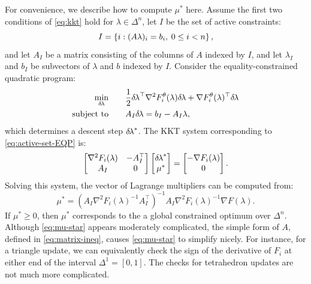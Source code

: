 \documentclass[eikonal.tex]{subfiles}
\begin{document}
For convenience, we describe how to compute $\mu^*$ here. Assume the
first two conditions of \cref{eq:kkt} hold for $\lambda \in \Delta^n$,
let $I$ be the set of active constraints:
\begin{equation}
  I = \left\{i : (A\lambda)_i = b_i, \hspace{0.25em} 0 \leq i < n\right\},
\end{equation}
and let $A_I$ be a matrix consisting of the columns of $A$ indexed by
$I$, and let $\lambda_I$ and $b_I$ be subvectors of $\lambda$ and $b$
indexed by $I$. Consider the equality-constrained quadratic program:
\begin{equation}
  \label{eq:active-set-EQP}
  \begin{split}
    \min_{\dellam} &\qquad \frac{1}{2} \dellam^\top \nabla^2 F_i^\theta (\lambda) \dellam + \nabla F_i^\theta(\lambda)^\top \dellam \\
    \text{subject to} &\qquad A_I \dellam = b_I - A_I \lambda,
  \end{split}
\end{equation}
which determines a descent step ${\delta \hspace{-0.1em} \lambda}^*$. The KKT system
corresponding to \cref{eq:active-set-EQP} is:
\begin{equation}
  \begin{bmatrix}
    \nabla^2 F_i (\lambda) & -A_I^\top \\
    A_I & 0
  \end{bmatrix} \begin{bmatrix}
    {\delta \hspace{-0.1em} \lambda}^* \\ \mu^*
  \end{bmatrix} = \begin{bmatrix}
    -\nabla F_i(\lambda) \\ 0
  \end{bmatrix}.
\end{equation}
Solving this system, the vector of Lagrange multipliers can be
computed from:
\begin{equation}\label{eq:mu-star}
  \mu^* = {(A_I \nabla^2 F_i(\lambda)^{-1} A_I^\top)}^{-1} A_I \nabla^2 F_i(\lambda)^{-1} \nabla F(\lambda).
\end{equation}
If $\mu^* \geq 0$, then $\mu^*$ corresponds to the a global
constrained optimum over $\Delta^n$. Although \cref{eq:mu-star}
appears moderately complicated, the simple form of $A$, defined in
\cref{eq:matrix-ineq}, causes \cref{eq:mu-star} to simplify
nicely. For instance, for a triangle update, we can equivalently check
the sign of the derivative of $F_i$ at either end of the interval
$\Delta^1 = [0, 1]$. The checks for tetrahedron updates are not much
more complicated.
\end{document}
